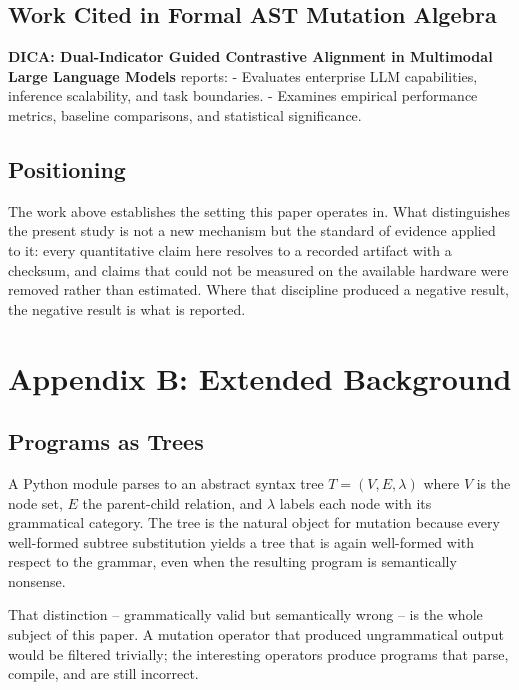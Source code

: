 \documentclass[10pt,twocolumn,letterpaper]{article}
\begin{document}
\subsection{Work Cited in Formal AST Mutation Algebra}


\textbf{DICA: Dual-Indicator Guided Contrastive Alignment in Multimodal Large Language Models} \cite{crossref_10_18653_v1_2026_findings_acl_1933} reports: - Evaluates enterprise LLM capabilities, inference scalability, and task boundaries. - Examines empirical performance metrics, baseline comparisons, and statistical significance.


\subsection{Positioning}


The work above establishes the setting this paper operates in. What distinguishes the present study is not a new mechanism but the standard of evidence applied to it: every quantitative claim here resolves to a recorded artifact with a checksum, and claims that could not be measured on the available hardware were removed rather than estimated. Where that discipline produced a negative result, the negative result is what is reported.




\section{Appendix B: Extended Background}



\subsection{Programs as Trees}


A Python module parses to an abstract syntax tree $T = (V, E, \lambda)$ where $V$ is the node set, $E$ the parent-child relation, and $\lambda$ labels each node with its grammatical category. The tree is the natural object for mutation because every well-formed subtree substitution yields a tree that is again well-formed with respect to the grammar, even when the resulting program is semantically nonsense.

That distinction -- grammatically valid but semantically wrong -- is the whole subject of this paper. A mutation operator that produced ungrammatical output would be filtered trivially; the interesting operators produce programs that parse, compile, and are still incorrect.
\end{document}
